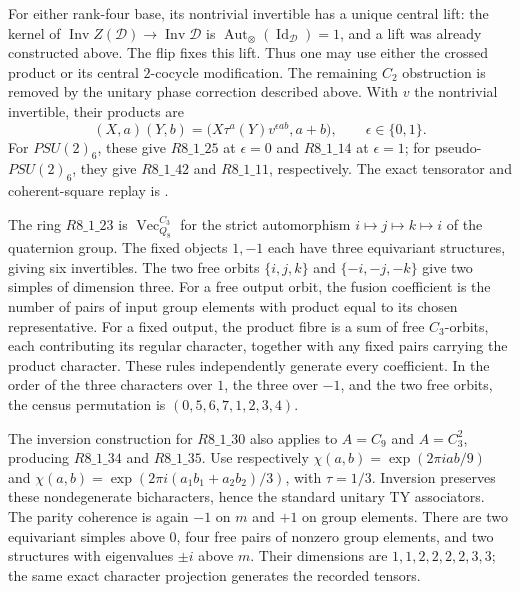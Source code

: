 \documentclass[11pt,reqno]{amsart}
\theoremstyle{definition}
\theoremstyle{remark}
\renewcommand{\Vec}{\operatorname{Vec}}
\newcommand{\sha}[1]{\texttt{\detokenize{#1}}}
\begin{document}
For either rank-four base, its nontrivial invertible has a unique central lift: the kernel of $\operatorname{Inv}Z(\mathcal D)\to\operatorname{Inv}\mathcal D$ is $\operatorname{Aut}_\otimes(\operatorname{Id}_{\mathcal D})=1$, and a lift was already constructed above. The flip fixes this lift. Thus one may use either the crossed product or its central $2$-cocycle modification. The remaining $C_2$ obstruction is removed by the unitary phase correction described above. With $v$ the nontrivial invertible, their products are
\[
(X,a)(Y,b)=\bigl(X\tau^a(Y)v^{\epsilon ab},a+b\bigr),
\qquad \epsilon\in\{0,1\}.
\]
For $PSU(2)_6$, these give $R8\_1\_25$ at $\epsilon=0$ and $R8\_1\_14$ at $\epsilon=1$; for pseudo-$PSU(2)_6$, they give $R8\_1\_42$ and $R8\_1\_11$, respectively. The exact tensorator and coherent-square replay is \sha{software/verify_pseudo_psu_swap.py}.

The ring $R8\_1\_23$ is $\Vec_{Q_8}^{C_3}$ for the strict automorphism $i\mapsto j\mapsto k\mapsto i$ of the quaternion group. The fixed objects $1,-1$ each have three equivariant structures, giving six invertibles. The two free orbits $\{i,j,k\}$ and $\{-i,-j,-k\}$ give two simples of dimension three. For a free output orbit, the fusion coefficient is the number of pairs of input group elements with product equal to its chosen representative. For a fixed output, the product fibre is a sum of free $C_3$-orbits, each contributing its regular character, together with any fixed pairs carrying the product character. These rules independently generate every coefficient. In the order of the three characters over $1$, the three over $-1$, and the two free orbits, the census permutation is $(0,5,6,7,1,2,3,4)$.

The inversion construction for $R8\_1\_30$ also applies to $A=C_9$ and $A=C_3^2$, producing $R8\_1\_34$ and $R8\_1\_35$. Use respectively $\chi(a,b)=\exp(2\pi iab/9)$ and $\chi(a,b)=\exp(2\pi i(a_1b_1+a_2b_2)/3)$, with $\tau=1/3$. Inversion preserves these nondegenerate bicharacters, hence the standard unitary TY associators. The parity coherence is again $-1$ on $m$ and $+1$ on group elements. There are two equivariant simples above $0$, four free pairs of nonzero group elements, and two structures with eigenvalues $\pm i$ above $m$. Their dimensions are $1,1,2,2,2,2,3,3$; the same exact character projection generates the recorded tensors.
\end{document}
